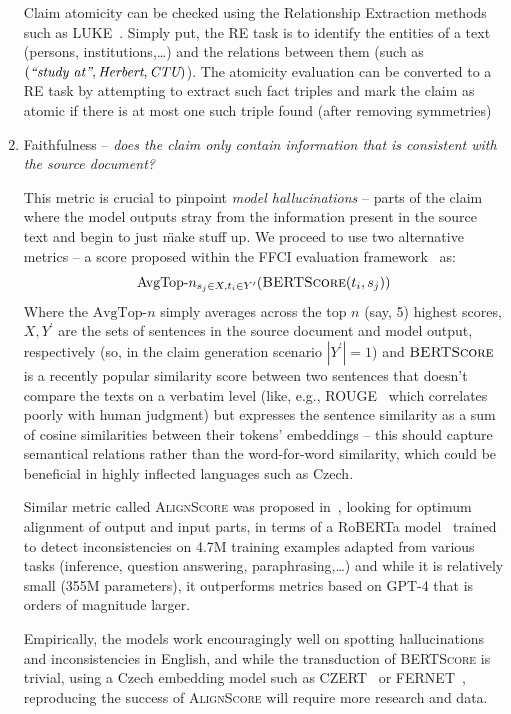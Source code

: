 \begin{enumerate}
    Claim atomicity can be checked using the Relationship Extraction methods such as LUKE~\cite{yamada2020luke}. Simply put, the RE task is to identify the entities of a text (persons, institutions,\dots) and the relations between them (such as $(\textit{\"{study at}}, \textit{Herbert}, \textit{CTU})$). The atomicity evaluation can be converted to a RE task by attempting to extract such fact triples and mark the claim as atomic if there is at most one such triple found (after removing symmetries)

    \item {\techbf Faithfulness} -- \textit{does the claim only contain information that is consistent with the source document?}
    
    This metric is crucial to pinpoint \textit{model hallucinations} -- parts of the claim where the model outputs stray from the information present in the source text and begin to just \"{make stuff up}. We proceed to use two alternative metrics -- a score proposed within the FFCI evaluation framework~\cite{ffci} as: 
    $$\text{AvgTop-}n_{s_j\in X, t_i\in Y^\prime}(\textsc{BERTScore}(t_i,s_j))$$
    Where the $\text{AvgTop-}n$ simply averages across the top $n$ (say, 5) highest scores, $X,Y^\prime$ are the sets of sentences in the source document and model output, respectively (so, in the claim generation scenario $|Y^\prime|=1$) and $\textsc{BERTScore}$~\cite{bert-score} is a recently popular similarity score between two sentences that doesn't compare the texts on a verbatim level (like, e.g., ROUGE~\cite{lin-2004-rouge} which correlates poorly with human judgment) but expresses the sentence similarity as a sum of cosine similarities between their tokens' embeddings -- this should capture semantical relations rather than the word-for-word similarity, which could be beneficial in highly inflected languages such as Czech.

    Similar metric called \textsc{AlignScore} was proposed in~\cite{zha2023alignscore}, looking for optimum alignment of output and input parts, in terms of a RoBERTa model~\cite{roberta} trained to detect inconsistencies on 4.7M training examples adapted from various tasks (inference, question answering, paraphrasing,\dots) and while it is relatively small (355M parameters), it outperforms metrics based on GPT-4 that is orders of magnitude larger. 

    Empirically, the models work encouragingly well on spotting hallucinations and inconsistencies in English, and while the transduction of \textsc{BERTScore} is trivial, using a Czech embedding model such as CZERT~\cite{czert} or FERNET~\cite{fernet}, reproducing the success of \textsc{AlignScore} will require more research and data.


\end{enumerate}
